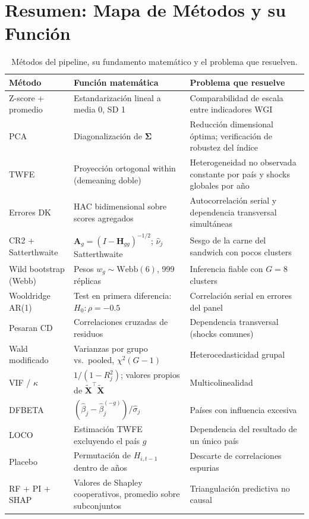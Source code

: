 \documentclass[12pt, a4paper]{article}
\theoremstyle{definition}
\begin{document}
\section{Resumen: Mapa de Métodos y su Función}

\begin{table}[ht]
\centering
\renewcommand{\arraystretch}{1.4}
\begin{tabular}{@{}p{3.5cm}p{4.5cm}p{5cm}@{}}
\toprule
\textbf{Método} & \textbf{Función matemática} & \textbf{Problema que resuelve} \\
\midrule
Z-score + promedio & Estandarización lineal a media 0, SD 1 & Comparabilidad de escala entre indicadores WGI \\
PCA & Diagonalización de $\bm{\Sigma}$ & Reducción dimensional óptima; verificación de robustez del índice \\
TWFE & Proyección ortogonal within (demeaning doble) & Heterogeneidad no observada constante por país y shocks globales por año \\
Errores DK & HAC bidimensional sobre scores agregados & Autocorrelación serial y dependencia transversal simultáneas \\
CR2 + Satterthwaite & $\bm{A}_g = (I-\bm{H}_{gg})^{-1/2}$; $\hat\nu_j$ Satterthwaite & Sesgo de la carne del sandwich con pocos clusters \\
Wild bootstrap (Webb) & Pesos $w_g \sim \text{Webb}(6)$, 999 réplicas & Inferencia fiable con $G = 8$ clusters \\
Wooldridge AR(1) & Test en primera diferencia: $H_0: \rho = -0.5$ & Correlación serial en errores del panel \\
Pesaran CD & Correlaciones cruzadas de residuos & Dependencia transversal (shocks comunes) \\
Wald modificado & Varianzas por grupo vs.\ pooled, $\chi^2(G-1)$ & Heterocedasticidad grupal \\
VIF / $\kappa$ & $1/(1-R^2_j)$; valores propios de $\tilde{\bm{X}}^\top\tilde{\bm{X}}$ & Multicolinealidad \\
DFBETA & $(\hat\beta_j - \hat\beta^{(-g)}_j)/\hat\sigma_j$ & Países con influencia excesiva \\
LOCO & Estimación TWFE excluyendo el país $g$ & Dependencia del resultado de un único país \\
Placebo & Permutación de $H_{i,t-1}$ dentro de años & Descarte de correlaciones espurias \\
RF + PI + SHAP & Valores de Shapley cooperativos, promedio sobre subconjuntos & Triangulación predictiva no causal \\
\bottomrule
\end{tabular}
\caption{Métodos del pipeline, su fundamento matemático y el problema que resuelven.}
\label{tab:resumen}
\end{table}
\end{document}

